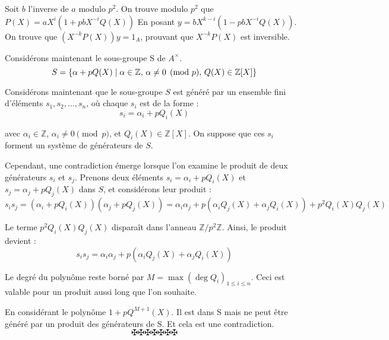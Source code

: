 Soit $b$ l'inverse de $a$ modulo $p^2$. On trouve modulo $p^2$ que $P (X) =
aX^i (1 + pbX^{- i} Q (X))$ En posant $y = bX^{k - i} (1 - pbX^{- i} Q (X))$.
On trouve que $(X^{- k} P (X)) y = 1_A$, prouvant que $X^{- k} P (X)$ est
inversible.

Consid{\'e}rons maintenant le sous-groupe S de $A^{\times}$.
\[ S = \left\{ \alpha + pQ (X) \mid \alpha \in \mathbb{Z}, \hspace{0.17em}
   \alpha \neq 0 \pmod{p}, \hspace{0.17em} Q (X) \in \mathbb{Z}[X] \right\} \]


Consid{\'e}rons maintenant que le sous-groupe $S$ est g{\'e}n{\'e}r{\'e} par
un ensemble fini d'{\'e}l{\'e}ments $s_1, s_2, \ldots, s_n$, o{\`u} chaque
$s_i$ est de la forme :
\[ s_i = \alpha_i + pQ_i (X) \]


avec $\alpha_i \in \mathbb{Z}$, $\alpha_i \neq 0 \pmod{p}$, et $Q_i (X) \in
\mathbb{Z}[X]$. On suppose que ces $s_i$ forment un syst{\`e}me de
g{\'e}n{\'e}rateurs de $S$.

Cependant, une contradiction {\'e}merge lorsque l'on examine le produit de
deux g{\'e}n{\'e}rateurs $s_i$ et $s_j$. Prenons deux {\'e}l{\'e}ments $s_i =
\alpha_i + pQ_i (X)$ et $s_j = \alpha_j + pQ_j (X)$ dans $S$, et
consid{\'e}rons leur produit :
\[ s_i s_j = (\alpha_i + pQ_i (X)) (\alpha_j + pQ_j (X)) = \alpha_i \alpha_j +
   p (\alpha_i Q_j (X) + \alpha_j Q_i (X)) + p^2 Q_i (X) Q_j (X) \]


Le terme $p^2 Q_i (X) Q_j (X)$ dispara{\^i}t dans l'anneau $\mathbb{Z}/ p^2
\mathbb{Z}$. Ainsi, le produit devient :
\[ s_i s_j = \alpha_i \alpha_j + p (\alpha_i Q_j (X) + \alpha_j Q_i (X)) \]


Le degr{\'e} du polyn{\^o}me reste born{\'e} par $M = \max (\deg Q_i)_{1 \leq
i \leq n}$. Ceci est valable pour un produit aussi long que l'on souhaite.

En consid{\'e}rant le polyn{\^o}me $1 + pQ^{M + 1} (X)$. Il est dans S mais ne
peut {\^e}tre g{\'e}n{\'e}r{\'e} par un produit des g{\'e}n{\'e}rateurs de S.
Et cela est une contradiction.
\[ \maltese \maltese \maltese \maltese \maltese \maltese \maltese \]
